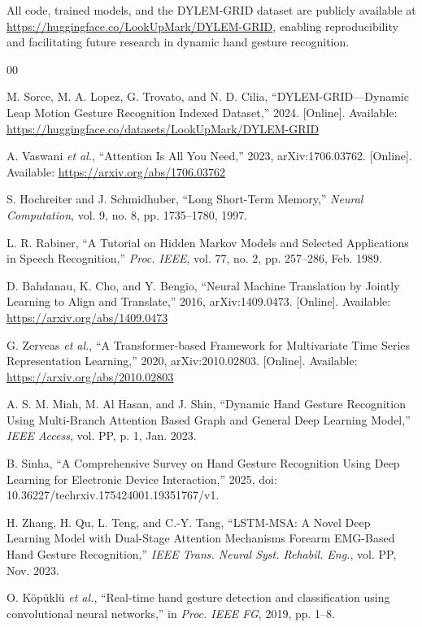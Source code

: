 \documentclass[conference]{IEEEtran}
\begin{document}
All code, trained models, and the DYLEM-GRID dataset are publicly available at \url{https://huggingface.co/LookUpMark/DYLEM-GRID}, enabling reproducibility and facilitating future research in dynamic hand gesture recognition.

\begin{thebibliography}{00}

M. Sorce, M. A. Lopez, G. Trovato, and N. D. Cilia, ``DYLEM-GRID---Dynamic Leap Motion Gesture Recognition Indexed Dataset,'' 2024. [Online]. Available: \url{https://huggingface.co/datasets/LookUpMark/DYLEM-GRID}

A. Vaswani \textit{et al.}, ``Attention Is All You Need,'' 2023, arXiv:1706.03762. [Online]. Available: \url{https://arxiv.org/abs/1706.03762}

S. Hochreiter and J. Schmidhuber, ``Long Short-Term Memory,'' \textit{Neural Computation}, vol. 9, no. 8, pp. 1735--1780, 1997.

L. R. Rabiner, ``A Tutorial on Hidden Markov Models and Selected Applications in Speech Recognition,'' \textit{Proc. IEEE}, vol. 77, no. 2, pp. 257--286, Feb. 1989.

D. Bahdanau, K. Cho, and Y. Bengio, ``Neural Machine Translation by Jointly Learning to Align and Translate,'' 2016, arXiv:1409.0473. [Online]. Available: \url{https://arxiv.org/abs/1409.0473}

G. Zerveas \textit{et al.}, ``A Transformer-based Framework for Multivariate Time Series Representation Learning,'' 2020, arXiv:2010.02803. [Online]. Available: \url{https://arxiv.org/abs/2010.02803}

A. S. M. Miah, M. Al Hasan, and J. Shin, ``Dynamic Hand Gesture Recognition Using Multi-Branch Attention Based Graph and General Deep Learning Model,'' \textit{IEEE Access}, vol. PP, p. 1, Jan. 2023.

B. Sinha, ``A Comprehensive Survey on Hand Gesture Recognition Using Deep Learning for Electronic Device Interaction,'' 2025, doi: 10.36227/techrxiv.175424001.19351767/v1.

H. Zhang, H. Qu, L. Teng, and C.-Y. Tang, ``LSTM-MSA: A Novel Deep Learning Model with Dual-Stage Attention Mechanisms Forearm EMG-Based Hand Gesture Recognition,'' \textit{IEEE Trans. Neural Syst. Rehabil. Eng.}, vol. PP, Nov. 2023.

O. Köpüklü \textit{et al.}, ``Real-time hand gesture detection and classification using convolutional neural networks,'' in \textit{Proc. IEEE FG}, 2019, pp. 1--8.

\end{thebibliography}
\end{document}

